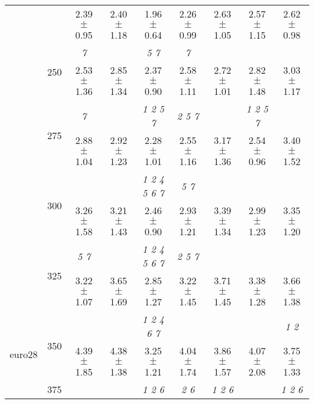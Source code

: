 \begin{table}[h]
{\begin{tabular}{
        ccccccccc}
 & & \cellcolor[HTML]{EFEFEF} 2.39 $\pm$ 0.95& \cellcolor[HTML]{EFEFEF} 2.40 $\pm$ 1.18& \cellcolor[HTML]{EFEFEF} 1.96 $\pm$ 0.64& \cellcolor[HTML]{EFEFEF} 2.26 $\pm$ 0.99& \cellcolor[HTML]{EFEFEF} 2.63 $\pm$ 1.05& \cellcolor[HTML]{EFEFEF} 2.57 $\pm$ 1.15& \cellcolor[HTML]{EFEFEF} 2.62 $\pm$ 0.98 \\ 
 & \multirow{2}{*}{250}& \textit{ 7 }& & \textit{ 5 7 }& \textit{ 7 }& & &  \\ 
 & & 2.53 $\pm$ 1.36& 2.85 $\pm$ 1.34& 2.37 $\pm$ 0.90& 2.58 $\pm$ 1.11& 2.72 $\pm$ 1.01& 2.82 $\pm$ 1.48& 3.03 $\pm$ 1.17 \\ 
 & \multirow{2}{*}{275}& \cellcolor[HTML]{EFEFEF} \textit{ 7 }& \cellcolor[HTML]{EFEFEF} & \cellcolor[HTML]{EFEFEF} \textit{ 1 2 5 7 }& \cellcolor[HTML]{EFEFEF} \textit{ 2 5 7 }& \cellcolor[HTML]{EFEFEF} & \cellcolor[HTML]{EFEFEF} \textit{ 1 2 5 7 }& \cellcolor[HTML]{EFEFEF}  \\ 
 & & \cellcolor[HTML]{EFEFEF} 2.88 $\pm$ 1.04& \cellcolor[HTML]{EFEFEF} 2.92 $\pm$ 1.23& \cellcolor[HTML]{EFEFEF} 2.28 $\pm$ 1.01& \cellcolor[HTML]{EFEFEF} 2.55 $\pm$ 1.16& \cellcolor[HTML]{EFEFEF} 3.17 $\pm$ 1.36& \cellcolor[HTML]{EFEFEF} 2.54 $\pm$ 0.96& \cellcolor[HTML]{EFEFEF} 3.40 $\pm$ 1.52 \\ 
 & \multirow{2}{*}{300}& & & \textit{ 1 2 4 5 6 7 }& \textit{ 5 7 }& & &  \\ 
 & & 3.26 $\pm$ 1.58& 3.21 $\pm$ 1.43& 2.46 $\pm$ 0.90& 2.93 $\pm$ 1.21& 3.39 $\pm$ 1.34& 2.99 $\pm$ 1.23& 3.35 $\pm$ 1.20 \\ 
 & \multirow{2}{*}{325}& \cellcolor[HTML]{EFEFEF} \textit{ 5 7 }& \cellcolor[HTML]{EFEFEF} & \cellcolor[HTML]{EFEFEF} \textit{ 1 2 4 5 6 7 }& \cellcolor[HTML]{EFEFEF} \textit{ 2 5 7 }& \cellcolor[HTML]{EFEFEF} & \cellcolor[HTML]{EFEFEF} & \cellcolor[HTML]{EFEFEF}  \\ 
 & & \cellcolor[HTML]{EFEFEF} 3.22 $\pm$ 1.07& \cellcolor[HTML]{EFEFEF} 3.65 $\pm$ 1.69& \cellcolor[HTML]{EFEFEF} 2.85 $\pm$ 1.27& \cellcolor[HTML]{EFEFEF} 3.22 $\pm$ 1.45& \cellcolor[HTML]{EFEFEF} 3.71 $\pm$ 1.45& \cellcolor[HTML]{EFEFEF} 3.38 $\pm$ 1.28& \cellcolor[HTML]{EFEFEF} 3.66 $\pm$ 1.38 \\ 
 \multirow{4}{*}{euro28} & \multirow{2}{*}{350}& & & \textit{ 1 2 4 6 7 }& & & & \textit{ 1 2 } \\ 
 & & 4.39 $\pm$ 1.85& 4.38 $\pm$ 1.38& 3.25 $\pm$ 1.21& 4.04 $\pm$ 1.74& 3.86 $\pm$ 1.57& 4.07 $\pm$ 2.08& 3.75 $\pm$ 1.33 \\ 
 & \multirow{2}{*}{375}& \cellcolor[HTML]{EFEFEF} & \cellcolor[HTML]{EFEFEF} & \cellcolor[HTML]{EFEFEF} \textit{ 1 2 6 }& \cellcolor[HTML]{EFEFEF} \textit{ 2 6 }& \cellcolor[HTML]{EFEFEF} \textit{ 1 2 6 }& \cellcolor[HTML]{EFEFEF} & \cellcolor[HTML]{EFEFEF} \textit{ 1 2 6 } \\ 

\end{tabular}}
\end{table}
